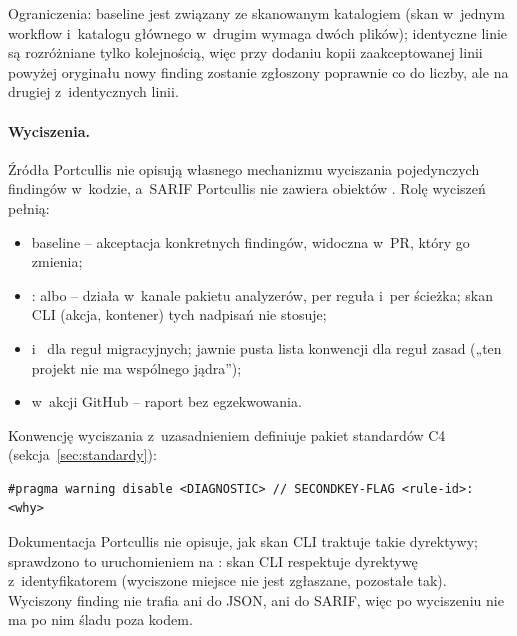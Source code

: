 Ograniczenia: baseline jest związany ze skanowanym katalogiem (skan  w~jednym
workflow i~katalogu głównego w~drugim wymaga dwóch plików); identyczne linie są
rozróżniane tylko kolejnością, więc przy dodaniu kopii zaakceptowanej linii powyżej
oryginału nowy finding zostanie zgłoszony poprawnie co do liczby, ale na drugiej
z~identycznych linii.

\paragraph{Wyciszenia.} Źródła Portcullis nie opisują własnego mechanizmu wyciszania
pojedynczych findingów w~kodzie, a~SARIF Portcullis nie zawiera obiektów
. Rolę wyciszeń pełnią:
\begin{itemize}[leftmargin=*]
  \item baseline -- akceptacja konkretnych findingów, widoczna w~PR, który go zmienia;
  \item {}:  albo
         -- działa w~kanale pakietu analyzerów, per reguła i~per
        ścieżka; skan CLI (akcja, kontener) tych nadpisań nie stosuje;
  \item {} i~ dla reguł
        migracyjnych; jawnie pusta lista konwencji dla reguł zasad („ten projekt nie ma
        wspólnego jądra”);
  \item {} w~akcji GitHub -- raport bez egzekwowania.
\end{itemize}
Konwencję wyciszania z~uzasadnieniem definiuje pakiet standardów C4
(sekcja~\ref{sec:standardy}):
\begin{lstlisting}
#pragma warning disable <DIAGNOSTIC> // SECONDKEY-FLAG <rule-id>: <why>
\end{lstlisting}
Dokumentacja Portcullis nie opisuje, jak skan CLI traktuje takie dyrektywy; sprawdzono to
uruchomieniem na : skan CLI respektuje dyrektywę
 z~identyfikatorem 
(wyciszone miejsce nie jest zgłaszane, pozostałe tak). Wyciszony finding nie trafia ani do
JSON, ani do SARIF, więc po wyciszeniu nie ma po nim śladu poza kodem.

